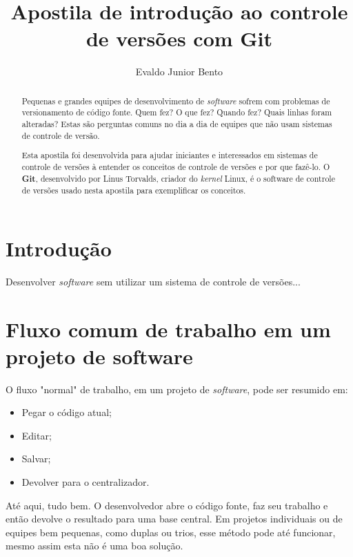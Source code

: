 \documentclass[12pt,a4paper]{report}
\begin{document}
\title{Apostila de introdução ao controle de versões com Git}
\author{Evaldo Junior Bento}

\maketitle

\begin{abstract}
Pequenas e grandes equipes de desenvolvimento de \textit{software} sofrem
com problemas de versionamento de código fonte. Quem fez? O que fez? Quando
fez? Quais linhas foram alteradas? Estas são perguntas comuns no dia a dia de
equipes que não usam sistemas de controle de versão.

Esta apostila foi desenvolvida para ajudar iniciantes e interessados em
sistemas de controle de versões à entender os conceitos de controle de versões
e por que fazê-lo. O \textbf{Git}, desenvolvido por Linus Torvalds, criador do
\textit{kernel} Linux, é o software de controle de versões usado nesta
apostila para exemplificar os conceitos.
\end{abstract}

\tableofcontents

\chapter{Introdução}
    Desenvolver \textit{software} sem utilizar um sistema de controle de versões...

\chapter{Fluxo comum de trabalho em um projeto de software}
    O fluxo "normal" de trabalho, em um projeto de \textit{software}, pode ser
    resumido em:
    \begin{itemize}
        \item Pegar o código atual;
        \item Editar;
        \item Salvar;
        \item Devolver para o centralizador.
    \end{itemize}
    Até aqui, tudo bem. O desenvolvedor abre o código fonte, faz seu trabalho e
    então devolve o resultado para uma base central. Em projetos individuais ou
    de equipes bem pequenas, como duplas ou trios, esse método pode até
    funcionar, mesmo assim esta não é uma boa solução.
    
\end{document}
